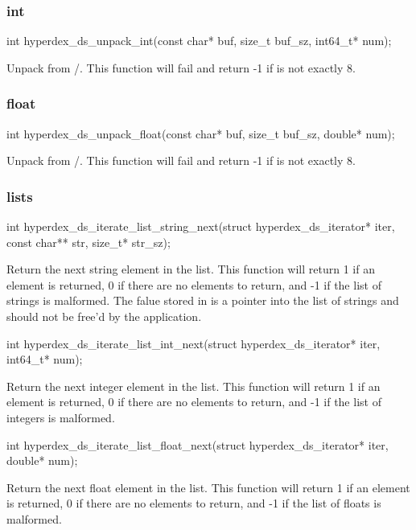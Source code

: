 \subsubsection{int}

\begin{ccode}
int hyperdex_ds_unpack_int(const char* buf, size_t buf_sz, int64_t* num);
\end{ccode}
\funcdesc Unpack  from /.  This function will
fail and return -1 if  is not exactly \unit{8}{\byte}.

\subsubsection{float}

\begin{ccode}
int hyperdex_ds_unpack_float(const char* buf, size_t buf_sz, double* num);
\end{ccode}
\funcdesc Unpack  from /.  This function will
fail and return -1 if  is not exactly \unit{8}{\byte}.

\subsubsection{lists}

\begin{ccode}
int hyperdex_ds_iterate_list_string_next(struct hyperdex_ds_iterator* iter,
                                         const char** str, size_t* str_sz);
\end{ccode}
\funcdesc Return the next string element in the list.  This function will return
1 if an element is returned, 0 if there are no elements to return, and -1 if the
list of strings is malformed.  The falue stored in  is a pointer into
the list of strings and should not be free'd by the application.

\funcsep
\begin{ccode}
int hyperdex_ds_iterate_list_int_next(struct hyperdex_ds_iterator* iter, int64_t* num);
\end{ccode}
\funcdesc Return the next integer element in the list.  This function will
return 1 if an element is returned, 0 if there are no elements to return, and -1
if the list of integers is malformed.

\funcsep
\begin{ccode}
int hyperdex_ds_iterate_list_float_next(struct hyperdex_ds_iterator* iter, double* num);
\end{ccode}
\funcdesc Return the next float element in the list.  This function will return
1 if an element is returned, 0 if there are no elements to return, and -1 if the
list of floats is malformed.


